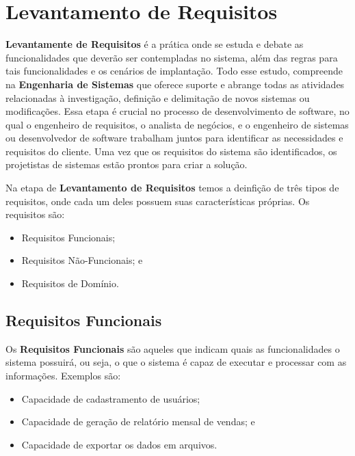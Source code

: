 \documentclass[a4paper,12pt]{article}
\begin{document}
\section{Levantamento de Requisitos}
\textbf{Levantamente de Requisitos} é a prática onde se estuda e debate as funcionalidades que deverão ser contempladas no sistema, além das regras para tais funcionalidades e os cenários de implantação. Todo esse estudo, compreende na \textbf{Engenharia de Sistemas} que oferece suporte e abrange todas as atividades relacionadas à investigação, definição e delimitação de novos sistemas ou modificações. Essa etapa é crucial no processo de desenvolvimento de software, no qual o engenheiro de requisitos, o analista de negócios, e o engenheiro de sistemas ou desenvolvedor de software trabalham juntos para identificar as necessidades e requisitos do cliente. Uma vez que os requisitos do sistema são identificados, os projetistas de sistemas estão prontos para criar a solução.

Na etapa de \textbf{Levantamento de Requisitos} temos a deinfição de três tipos de requisitos, onde cada um deles possuem suas características próprias. Os requisitos são:
\begin{itemize}
	\item Requisitos Funcionais;
	\item Requisitos Não-Funcionais; e
	\item Requisitos de Domínio.
\end{itemize}



\subsection{Requisitos Funcionais}
Os \textbf{Requisitos Funcionais} são aqueles que indicam quais as funcionalidades o sistema possuirá, ou seja, o que o sistema é capaz de executar e processar com as informações. Exemplos são:
\begin{itemize}
	\item Capacidade de cadastramento de usuários;
	\item Capacidade de geração de relatório mensal de vendas; e
	\item Capacidade de exportar os dados em arquivos.
\end{itemize}
\end{document}
